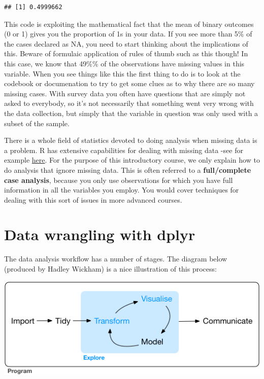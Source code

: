 \documentclass[]{book}
\newenvironment{Shaded}{\begin{snugshade}}{\end{snugshade}}
\newcommand{\KeywordTok}[1]{\textcolor[rgb]{0.13,0.29,0.53}{\textbf{#1}}}
\newcommand{\NormalTok}[1]{#1}
\newcommand{\OperatorTok}[1]{\textcolor[rgb]{0.81,0.36,0.00}{\textbf{#1}}}
\theoremstyle{definition}
\theoremstyle{definition}
\theoremstyle{definition}
\theoremstyle{remark}
\begin{document}
\begin{Shaded}
\end{Shaded}

\begin{verbatim}
## [1] 0.4999662
\end{verbatim}

This code is exploiting the mathematical fact that the mean of binary
outcomes (0 or 1) gives you the proportion of 1s in your data. If you
see more than 5\% of the cases declared as NA, you need to start
thinking about the implications of this. Beware of formulaic application
of rules of thumb such as this though! In this case, we know that 49\%\%
of the observations have missing values in this variable. When you see
things like this the first thing to do is to look at the codebook or
documenation to try to get some clues as to why there are so many
missing cases. With survey data you often have questions that are simply
not asked to everybody, so it's not necessarily that something went very
wrong with the data collection, but simply that the variable in question
was only used with a subset of the sample.

There is a whole field of statistics devoted to doing analysis when
missing data is a problem. R has extensive capabilities for dealing with
missing data -see for example
\href{http://www.crcpress.com/product/isbn/9781439868249}{here}. For the
purpose of this introductory course, we only explain how to do analysis
that ignore missing data. This is often referred to a
\textbf{full/complete case analysis}, because you only use observations
for which you have full information in all the variables you employ. You
would cover techniques for dealing with this sort of issues in more
advanced courses.

\hypertarget{data-wrangling-with-dplyr}{%
\section{Data wrangling with dplyr}\label{data-wrangling-with-dplyr}}

The data analysis workflow has a number of stages. The diagram below
(produced by Hadley Wickham) is a nice illustration of this process:

\includegraphics{imgs/data-science-explore.png}
\end{document}
